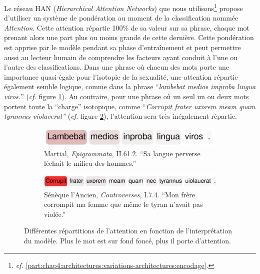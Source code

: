 
Le réseau HAN (\textit{Hierarchical Attention Networks}) que nous utilisons\footnote{\textit{cf.} \ref{part:chap4:architectures:variations-architectures:encodage}.} propose d'utiliser un système de pondération au moment de la classification nommée \textit{Attention}. Cette attention répartie 100\% de sa valeur sur sa phrase, chaque mot prenant alors une part plus ou moins grande de cette dernière. Cette pondération est apprise par le modèle pendant sa phase d'entraînement et peut permettre aussi au lecteur humain de comprendre les facteurs ayant conduit à l'une ou l'autre des classifications. Dans une phrase où chacun des mots porte une importance quasi-égale pour l'isotopie de la sexualité, une attention répartie également semble logique, comme dans la phrase ``\textit{lambebat medios improba lingua viros.}'' (\textit{cf.} figure \ref{fig:chap4:attention:repartie}). Au contraire, pour une phrase où un seul un ou deux mots portent toute la ``charge'' isotopique, comme ``\textit{Corrupit frater uxorem meam quam tyrannus violaverat''} (\textit{cf.} figure \ref{fig:chap4:attention:mono}), l'attention sera très inégalement répartie.

\begin{figure}
     \centering
     \begin{subfigure}[t]{0.45\textwidth}
         \centering
         \includegraphics[width=\textwidth]{figures/chap4/attention.png}
         \caption{Martial, \textit{Epigrammata}, II.61.2. ``Sa langue perverse léchait le milieu des hommes.''}
         \label{fig:chap4:attention:repartie}
     \end{subfigure}
     \hfill
     \begin{subfigure}[t]{0.45\textwidth}
         \centering
         \includegraphics[width=\textwidth]{figures/chap4/attention2.png}
         \caption{Sénèque l'Ancien, \textit{Controverses}, I.7.4. ``Mon frère corrompit ma femme que même le tyran n'avait pas violée.''}
         \label{fig:chap4:attention:mono}
     \end{subfigure}
    \caption{Différentes répartitions de l'attention en fonction de l'interprétation du modèle. Plus le mot est sur fond foncé, plus il porte d'attention.}
    \label{fig:chap4:attention}
\end{figure}

